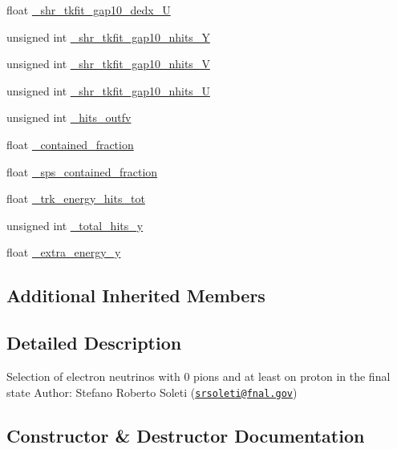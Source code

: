 \begin{DoxyCompactItemize}
\item 
float \hyperlink{classselection_1_1CC0piNpSelection_a3b32a837b2388327cee3eb07ad25a557}{\+\_\+shr\+\_\+tkfit\+\_\+gap10\+\_\+dedx\+\_\+U}
\item 
unsigned int \hyperlink{classselection_1_1CC0piNpSelection_ac4f7286273aa34122aa80e6dbf34b9f7}{\+\_\+shr\+\_\+tkfit\+\_\+gap10\+\_\+nhits\+\_\+Y}
\item 
unsigned int \hyperlink{classselection_1_1CC0piNpSelection_a1dac5397a17c360ce67831fa3ed8aed5}{\+\_\+shr\+\_\+tkfit\+\_\+gap10\+\_\+nhits\+\_\+V}
\item 
unsigned int \hyperlink{classselection_1_1CC0piNpSelection_ae639e53ae1ea9c2bed506ca5d2e5c486}{\+\_\+shr\+\_\+tkfit\+\_\+gap10\+\_\+nhits\+\_\+U}
\item 
unsigned int \hyperlink{classselection_1_1CC0piNpSelection_ac39ec79d190fb925f8d20b03cbeb0605}{\+\_\+hits\+\_\+outfv}
\item 
float \hyperlink{classselection_1_1CC0piNpSelection_a8e7933222bce1424aee24bae8dcf4864}{\+\_\+contained\+\_\+fraction}
\item 
float \hyperlink{classselection_1_1CC0piNpSelection_ac425fa284847d7cae95f21367ed4889e}{\+\_\+sps\+\_\+contained\+\_\+fraction}
\item 
float \hyperlink{classselection_1_1CC0piNpSelection_a82a48c6128c34252642d237b98f1b66a}{\+\_\+trk\+\_\+energy\+\_\+hits\+\_\+tot}
\item 
unsigned int \hyperlink{classselection_1_1CC0piNpSelection_a819d1d973e74bcd2ad82aa01ea24ac37}{\+\_\+total\+\_\+hits\+\_\+y}
\item 
float \hyperlink{classselection_1_1CC0piNpSelection_a2e386c361ecc27d22ff2642e80a629e4}{\+\_\+extra\+\_\+energy\+\_\+y}
\end{DoxyCompactItemize}
\subsection*{Additional Inherited Members}


\subsection{Detailed Description}
Selection of electron neutrinos with 0 pions and at least on proton in the final state Author\+: Stefano Roberto Soleti (\href{mailto:srsoleti@fnal.gov}{\tt srsoleti@fnal.\+gov}) 

\subsection{Constructor \& Destructor Documentation}
